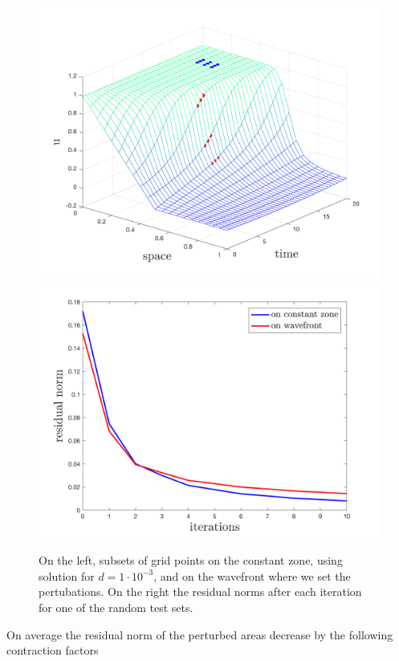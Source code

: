\documentclass[../draft_1.tex]{subfiles}
\begin{document}
\begin{figure}[ht!]
	\centering
	\includegraphics[scale=0.4]{images/implementation/lin_hessian/subsets_on_sol}
	\includegraphics[scale=0.4]{images/implementation/lin_hessian/res_norm}
	\caption{On the left, subsets of grid points on the constant zone, using solution for $d=1 \cdot 10^{-3}$, and on the wavefront where we set the pertubations. On the right the residual norms after each iteration for one of the random test sets.}
	\label{fig:pertubations}
\end{figure}

On average the residual norm of the perturbed areas decrease by the following contraction factors
\end{document}
